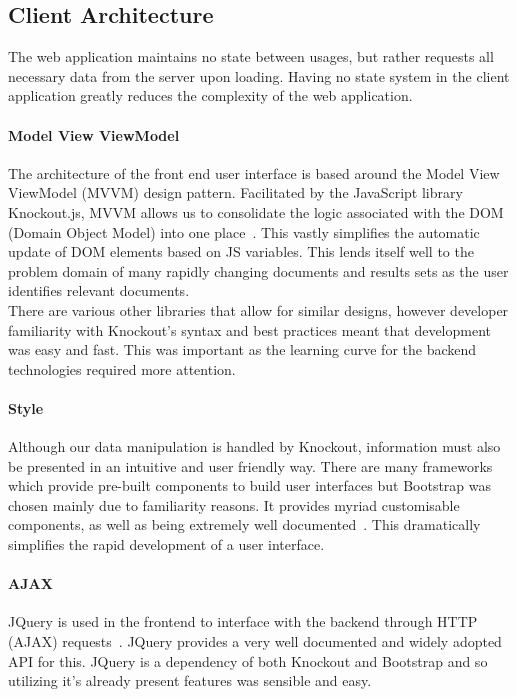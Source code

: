 \documentclass{l4proj}
\begin{document}
\subsection{Client Architecture}
The web application maintains no state between usages, but rather requests all necessary data from the server upon loading. Having no state system in the client application greatly reduces the complexity of the web application.
\paragraph{Model View ViewModel}
The architecture of the front end user interface is based around the Model View ViewModel (MVVM) design pattern. Facilitated by the JavaScript library Knockout.js, MVVM allows us to consolidate the logic associated with the DOM (Domain Object Model) into one place~\cite{knockout}.
%
This vastly simplifies the automatic update of DOM elements based on JS variables.
This lends itself well to the problem domain of many rapidly changing documents and results sets as the user identifies relevant documents. \\
There are various other libraries that allow for similar designs, however developer familiarity with Knockout's syntax and best practices meant that development was easy and fast.
This was important as the learning curve for the backend technologies required more attention.

\paragraph{Style}
Although our data manipulation is handled by Knockout, information must also be presented in an intuitive and user friendly way. There are many frameworks which provide pre-built components to build user interfaces but Bootstrap was chosen mainly due to familiarity reasons. It provides myriad customisable components, as well as being extremely well documented~\cite{bootstrap}. This dramatically simplifies the rapid development of a user interface.

\paragraph{AJAX}
JQuery is used in the frontend to interface with the backend through HTTP (AJAX) requests~\cite{jquery}. JQuery provides a very well documented and widely adopted API for this. JQuery is a dependency of both Knockout and Bootstrap and so utilizing it's already present features was sensible and easy.
\end{document}
